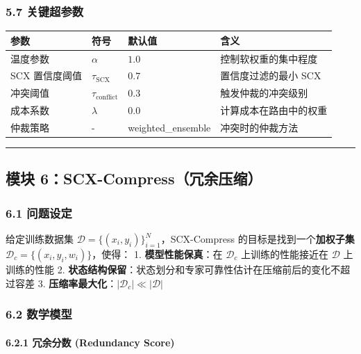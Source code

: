 \documentclass[
  12pt,
]{ctexart}
\begin{document}
\subsubsection{5.7 关键超参数}\label{ux5173ux952eux8d85ux53c2ux6570-4}

\begin{longtable}[]{@{}llll@{}}
\toprule\noalign{}
参数 & 符号 & 默认值 & 含义 \\
\midrule\noalign{}
\endhead
\bottomrule\noalign{}
\endlastfoot
温度参数 & \(\alpha\) & \(1.0\) & 控制软权重的集中程度 \\
SCX 置信度阈值 & \(\tau_{\text{SCX}}\) & \(0.7\) & 置信度过滤的最小
SCX \\
冲突阈值 & \(\tau_{\text{conflict}}\) & \(0.3\) & 触发仲裁的冲突级别 \\
成本系数 & \(\lambda\) & \(0.0\) & 计算成本在路由中的权重 \\
仲裁策略 & - & weighted\_ensemble & 冲突时的仲裁方法 \\
\end{longtable}

\begin{center}\rule{0.5\linewidth}{0.5pt}\end{center}

\subsection{模块
6：SCX-Compress（冗余压缩）}\label{ux6a21ux5757-6scx-compressux5197ux4f59ux538bux7f29}

\subsubsection{6.1 问题设定}\label{ux95eeux9898ux8bbeux5b9a-5}

给定训练数据集 \(\mathcal{D} = \{(x_i, y_i)\}_{i=1}^N\)，SCX-Compress
的目标是找到一个\textbf{加权子集}
\(\mathcal{D}_c = \{(x_i, y_i, w_i)\}\)，使得： 1.
\textbf{模型性能保真}：在 \(\mathcal{D}_c\) 上训练的性能接近在
\(\mathcal{D}\) 上训练的性能 2.
\textbf{状态结构保留}：状态划分和专家可靠性估计在压缩前后的变化不超过容差
3. \textbf{压缩率最大化}：\(|\mathcal{D}_c| \ll |\mathcal{D}|\)

\subsubsection{6.2 数学模型}\label{ux6570ux5b66ux6a21ux578b-5}

\paragraph{6.2.1 冗余分数 (Redundancy
Score)}\label{ux5197ux4f59ux5206ux6570-redundancy-score}
\end{document}
